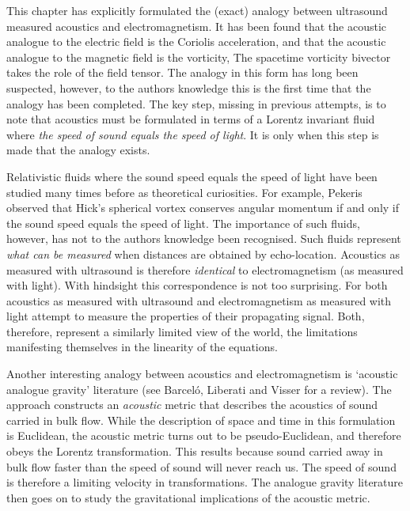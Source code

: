 \documentclass[10pt, fleqn,final,showtrims,oldfontcommands, article,a4paper,oneside]{memoir} %
\begin{document}
This  chapter has explicitly formulated the (exact) analogy between ultrasound measured acoustics 
and electromagnetism.
It has been found that the acoustic analogue to the electric field is the Coriolis acceleration,
and that the acoustic analogue to the magnetic field is the vorticity,
The spacetime vorticity bivector takes the role of the field tensor.
The analogy in this form has long been suspected\cite{Marmanis2000,Sridhar1998},
however, to the authors knowledge this is the first time that the analogy has been  completed.
The key step, missing in previous attempts, 
is to note that acoustics must be formulated in terms of a Lorentz invariant fluid where
{\em the speed of sound equals the speed of light}.
It is only when this step is made that the analogy exists.

Relativistic fluids where the sound speed equals the speed of light have been studied many times before
as theoretical curiosities\cite{Taub1978,Pekeris1977}.
For example, Pekeris observed that Hick's spherical vortex conserves angular momentum if and only if
the sound speed equals the speed of light\cite{Pekeris1977}.
The importance of such fluids, however, has not to the authors knowledge been recognised.
Such fluids represent {\em what can be measured} when distances are obtained by echo-location.
Acoustics as measured with ultrasound is therefore {\em identical} to electromagnetism (as measured with light).
With hindsight this correspondence is not too surprising.
For both acoustics as measured with ultrasound and electromagnetism as measured with light 
attempt to measure the properties of their propagating signal.
Both, therefore, 
represent a similarly limited view of the world,
the limitations manifesting themselves in the linearity of the equations.

Another interesting analogy between acoustics and electromagnetism is `acoustic analogue gravity' literature (see Barcel{\'o}, Liberati and Visser\cite{Barcelo2005} for a review).
The approach constructs an {\em acoustic} metric that describes the acoustics of sound carried in bulk flow.
While the description of space and time in this formulation is Euclidean, the acoustic metric turns out to be pseudo-Euclidean,
and therefore obeys the Lorentz transformation.
This results because sound carried away in bulk flow  faster than the speed of sound will never reach us.
The speed of sound is  therefore a limiting velocity in transformations.
The analogue gravity literature then goes on to study the gravitational implications of the acoustic metric.
\end{document}
